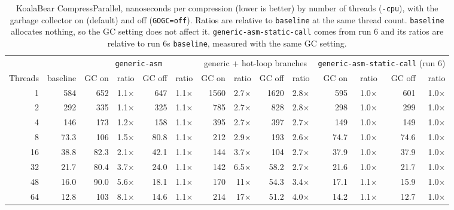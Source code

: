 \begin{table}[htbp]\centering\small
\caption{KoalaBear CompressParallel, nanoseconds per compression (lower is better) by number of threads (\texttt{-cpu}), with the garbage collector on (default) and off (\texttt{GOGC=off}). Ratios are relative to \texttt{baseline} at the same thread count. \texttt{baseline} allocates nothing, so the GC setting does not affect it. \texttt{generic-asm-static-call} comes from run 6 and its ratios are relative to run 6\textquotesingle s \texttt{baseline}, measured with the same GC setting.}\label{tab:parallel}
\begin{adjustbox}{max width=\linewidth}
\begin{tabular}{rr|rrrr|rrrr|rrrr}
\toprule
 & & \multicolumn{4}{c|}{\texttt{generic-asm}} & \multicolumn{4}{c|}{generic + hot-loop branches} & \multicolumn{4}{c}{\texttt{generic-asm-static-call} (run 6)} \\
Threads & baseline & GC on & ratio & GC off & ratio & GC on & ratio & GC off & ratio & GC on & ratio & GC off & ratio \\ \midrule
1 & 584 & 652 & 1.1$\times$ & 647 & 1.1$\times$ & 1560 & 2.7$\times$ & 1620 & 2.8$\times$ & 595 & 1.0$\times$ & 601 & 1.0$\times$ \\
2 & 292 & 335 & 1.1$\times$ & 325 & 1.1$\times$ & 785 & 2.7$\times$ & 828 & 2.8$\times$ & 298 & 1.0$\times$ & 299 & 1.0$\times$ \\
4 & 146 & 173 & 1.2$\times$ & 158 & 1.1$\times$ & 395 & 2.7$\times$ & 397 & 2.7$\times$ & 149 & 1.0$\times$ & 149 & 1.0$\times$ \\
8 & 73.3 & 106 & 1.5$\times$ & 80.8 & 1.1$\times$ & 212 & 2.9$\times$ & 193 & 2.6$\times$ & 74.7 & 1.0$\times$ & 74.6 & 1.0$\times$ \\
16 & 38.8 & 82.3 & 2.1$\times$ & 42.1 & 1.1$\times$ & 144 & 3.7$\times$ & 104 & 2.7$\times$ & 37.9 & 1.0$\times$ & 37.9 & 1.0$\times$ \\
32 & 21.7 & 80.4 & 3.7$\times$ & 24.0 & 1.1$\times$ & 142 & 6.5$\times$ & 58.2 & 2.7$\times$ & 21.6 & 1.0$\times$ & 21.7 & 1.0$\times$ \\
48 & 16.0 & 90.0 & 5.6$\times$ & 18.1 & 1.1$\times$ & 170 & 11$\times$ & 54.3 & 3.4$\times$ & 17.1 & 1.1$\times$ & 15.9 & 1.0$\times$ \\
64 & 12.8 & 103 & 8.1$\times$ & 14.6 & 1.1$\times$ & 214 & 17$\times$ & 51.2 & 4.0$\times$ & 14.2 & 1.1$\times$ & 12.7 & 1.0$\times$ \\
\bottomrule
\end{tabular}
\end{adjustbox}
\end{table}
